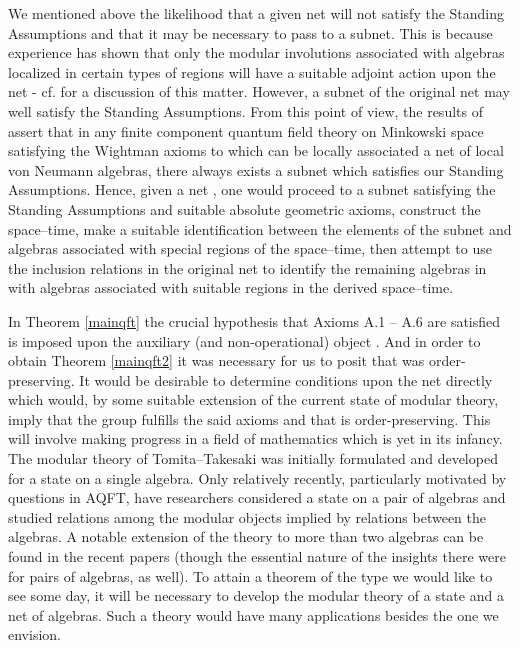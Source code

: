 \documentclass[a4paper,twoside,12pt]{article}
\def\inet{{\{\As_i \}_{i \in I}}}
\def\wrnet{{\{\Rs(W)\}_{W \in\Ws}}}
\def\rnet{{\{\Rs(\Os)\}_{\Os\in\Ss}}}
\def\As{{\cal A}}
\def\Js{{\cal J}}
\def\Os{{\cal O}}
\def\Rs{{\cal R}}
\def\Ss{{\cal S}}
\def\Ws{{\cal W}}
\begin{document}
     We mentioned above the likelihood that a given net \myHighlight{$\inet$}\coordHE{} will
not satisfy the Standing Assumptions and that it may be necessary to
pass to a subnet. This is because experience has shown that only the
modular involutions associated with algebras localized in certain
types of regions will have a suitable adjoint action upon the net -
cf. \cite{BDFS} for a discussion of this matter.  However, a subnet of
the original net may well satisfy the Standing Assumptions. From this
point of view, the results of \cite{BW} assert that in any finite
component quantum field theory on Minkowski space satisfying the
Wightman axioms to which can be locally associated a net \myHighlight{$\rnet$}\coordHE{} of
local von Neumann algebras, there always exists a subnet \myHighlight{$\wrnet$}\coordHE{}
which satisfies our Standing Assumptions. Hence, given a net \myHighlight{$\inet$}\coordHE{},
one would proceed to a subnet satisfying the Standing Assumptions and
suitable absolute geometric axioms, construct the space--time,
make a suitable identification between the elements of the subnet and
algebras associated with special regions of the space--time, then
attempt to use the inclusion relations in the original net \myHighlight{$\inet$}\coordHE{} to
identify the remaining algebras in \myHighlight{$\inet$}\coordHE{} with algebras associated
with suitable regions in the derived space--time.

     In Theorem \ref{mainqft} the crucial hypothesis that Axioms A.1
-- A.6 are satisfied is imposed upon the auxiliary (and
non-operational) object \myHighlight{$\Js$}\coordHE{}. And in order to obtain Theorem
\ref{mainqft2} it was necessary for us to posit that \myHighlight{$\chi$}\coordHE{} was
order-preserving. It would be desirable to determine conditions upon
the net \myHighlight{$\inet$}\coordHE{} directly which would, by some suitable extension of
the current state of modular theory, imply that the group \myHighlight{$\Js$}\coordHE{}
fulfills the said axioms and that \myHighlight{$\chi$}\coordHE{} is order-preserving. This
will involve making progress in a field of mathematics which is yet in
its infancy. The modular theory of Tomita--Takesaki was initially
formulated and developed for a state on a single algebra. Only
relatively recently, particularly motivated by questions in AQFT, have
researchers considered a state on a pair of algebras and studied
relations among the modular objects implied by relations between the
algebras. A notable extension of the theory to more than two algebras
can be found in the recent papers \cite{Wies,KW} (though the essential
nature of the insights there were for pairs of algebras, as well).  To
attain a theorem of the type we would like to see some day, it will be
necessary to develop the modular theory of a state and a net of
algebras. Such a theory would have many applications besides the one
we envision.
\end{document}
